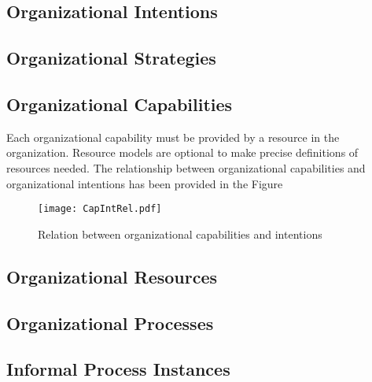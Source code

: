\subsection{Organizational Intentions} 
\label{sec:intentions}


\subsection{Organizational Strategies} 
\label{sec:strategies}

\subsection{Organizational Capabilities}
\label{sec:capabilities}
 Each organizational capability must be provided by a resource in the organization. Resource models are optional to make precise definitions of resources needed. The relationship between organizational capabilities and organizational intentions has been provided in the Figure 

\begin{figure}
	\centering
	\texttt{[image: CapIntRel.pdf]}
	\caption{Relation between organizational capabilities and intentions}
	\label{fig:orgcapabilities}
\end{figure}


\subsection{Organizational Resources} 
\label{sec:resources}



\subsection{Organizational Processes} 
\label{sec:processes}

\subsection{Informal Process Instances} 
\label{sec:ipinstances}
